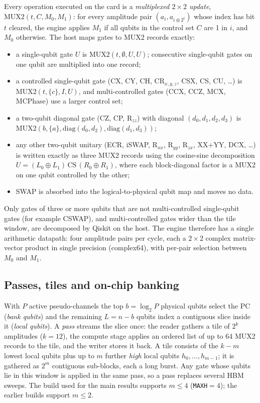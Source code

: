 \documentclass[pdflatex,sn-mathphys-num]{sn-jnl}
\theoremstyle{thmstyleone}
\theoremstyle{thmstylethree}
\begin{document}
Every operation executed on the card is a \emph{multiplexed $2\times2$ update}, $\mathrm{MUX2}(t, C, M_0, M_1)$: for every amplitude pair $(a_{i}, a_{i\oplus 2^t})$ whose index has bit $t$ cleared, the engine applies $M_1$ if all qubits in the control set $C$ are 1 in $i$, and $M_0$ otherwise. The host maps gates to MUX2 records exactly:
\begin{itemize}
\item a single-qubit gate $U$ is $\mathrm{MUX2}(t,\emptyset,U,U)$; consecutive single-qubit gates on one qubit are multiplied into one record;
\item a controlled single-qubit gate (CX, CY, CH, CR$_{x,y,z}$, CSX, CS, CU, \ldots) is $\mathrm{MUX2}(t,\{c\},I,U)$, and multi-controlled gates (CCX, CCZ, MCX, MCPhase) use a larger control set;
\item a two-qubit diagonal gate (CZ, CP, R$_{zz}$) with diagonal $(d_0,d_1,d_2,d_3)$ is $\mathrm{MUX2}(b,\{a\},\mathrm{diag}(d_0,d_2),\mathrm{diag}(d_1,d_3))$;
\item any other two-qubit unitary (ECR, iSWAP, R$_{xx}$, R$_{yy}$, R$_{zx}$, XX$+$YY, DCX, \ldots) is written exactly as three MUX2 records using the cosine-sine decomposition $U=(L_0\oplus L_1)\,\mathrm{CS}\,(R_0\oplus R_1)$, where each block-diagonal factor is a MUX2 on one qubit controlled by the other;
\item SWAP is absorbed into the logical-to-physical qubit map and moves no data.
\end{itemize}
Only gates of three or more qubits that are not multi-controlled single-qubit gates (for example CSWAP), and multi-controlled gates wider than the tile window, are decomposed by Qiskit on the host. The engine therefore has a single arithmetic datapath: four amplitude pairs per cycle, each a $2\times2$ complex matrix-vector product in single precision (complex64), with per-pair selection between $M_0$ and $M_1$.

\subsection{Passes, tiles and on-chip banking}\label{subsec:tiles}

With $P$ active pseudo-channels the top $b=\log_2 P$ physical qubits select the PC (\emph{bank qubits}) and the remaining $L=n-b$ qubits index a contiguous slice inside it (\emph{local qubits}). A \emph{pass} streams the slice once: the reader gathers a tile of $2^{k}$ amplitudes ($k=12$), the compute stage applies an ordered list of up to 64 MUX2 records to the tile, and the writer stores it back. A tile consists of the $k-m$ lowest local qubits plus up to $m$ further \emph{high} local qubits $h_0,\ldots,h_{m-1}$; it is gathered as $2^m$ contiguous sub-blocks, each a long burst. Any gate whose qubits lie in this window is applied in the same pass, so a pass replaces several HBM sweeps. The build used for the main results supports $m\leq 4$ (\texttt{MAXH}$=4$); the earlier builds support $m\leq 2$.
\end{document}
